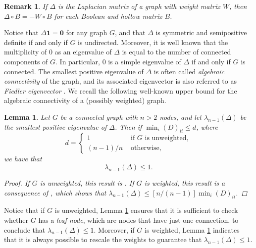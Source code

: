 \documentclass[a4paper,12pt]{article}
\newtheorem{lemma}{Lemma}
\newtheorem{remark}{Remark}
\begin{document}
\begin{remark}
    If $\Delta$ is the Laplacian matrix of a graph with weight matrix $W$, then $\Delta\circ B = - W\circ B$ for each Boolean and hollow matrix $B$. 
\end{remark}

Notice that $\Delta\mathbf{1}=\mathbf{0}$ for any graph $G$, and that $\Delta$ is symmetric and semipositive definite if and only if $G$ is undirected. 
Moreover, it is well known that the multiplicity of $0$ as an eigenvalue of $\Delta$ is equal to the number of connected components of $G$. In particular, $0$ is a simple eigenvalue of $\Delta$ if and only if $G$ is connected. The smallest positive eigenvalue of $\Delta$ is often called \emph{algebraic connectivity} of the graph, and its associated eigenvector is also referred to as \emph{Fiedler eigenvector} \cite{Fiedler_algebraic_connectivity}. We recall the following well-known upper bound for the algebraic connectivity of a (possibly weighted) graph. 

\begin{lemma}\label{lemma:bound_algebraic_connectivity}
Let $G$ be a connected graph with $n> 2$ nodes, and let $\lambda_{n-1}(\Delta)$ be the smallest positive eigenvalue of $\Delta$. Then if $\min_{i} (D)_{ii} \leq d$, where
\begin{equation*}
d =
    \begin{cases}
        1 & \text{ if $G$ is unweighted}, \\
        (n-1)/n &\text{ otherwise},
    \end{cases}
\end{equation*}
we have that 
\begin{equation*}
\lambda_{n-1}(\Delta) \leq 1.
\end{equation*}

\begin{proof}
If $G$ is unweighted, this result is \cite[Theorem 5.9]{Das_algebraic_connectivity}. If $G$ is weighted, this result is a consequence of \cite[Proposition 3.5]{Fiedler_algebraic_connectivity}, which shows that $\lambda_{n-1}(\Delta)\leq [n/(n-1)]\min_{i}(D)_{ii}$.  
\end{proof}
\end{lemma}
 Notice that if $G$ is unweighted, Lemma \ref{lemma:bound_algebraic_connectivity} ensures that it is sufficient to check whether $G$ has a \emph{leaf node}, which are nodes that have just one connection, to conclude that $\lambda_{n-1}(\Delta) \leq 1$. Moreover, if $G$ is weighted,  Lemma \ref{lemma:bound_algebraic_connectivity} indicates that it is always possible to rescale the weights to guarantee that $\lambda_{n-1}(\Delta) \leq 1$. \newline
\end{document}
